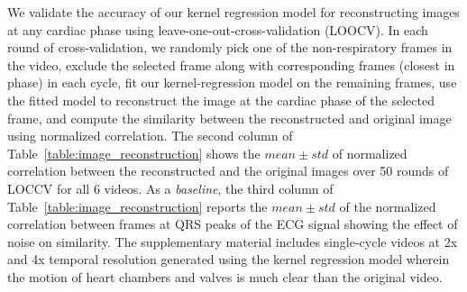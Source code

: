\documentclass[runningheads,a4paper]{llncs}
\begin{document}
	We validate the accuracy of our kernel regression model for reconstructing images at any cardiac phase using leave-one-out-cross-validation (LOOCV). In each round of cross-validation, we randomly pick one of the non-respiratory frames in the video, exclude the selected frame along with corresponding frames (closest in phase) in each cycle, fit our kernel-regression model on the remaining frames, use the fitted model to reconstruct the image at the cardiac phase of the selected frame, and compute the similarity between the reconstructed and original image using normalized correlation. The second column of Table~\ref{table:image_reconstruction} shows the $mean \pm std$ of normalized correlation between the reconstructed and the original images over 50 rounds of LOCCV for all 6 videos. As a \emph{baseline}, the third column of  Table~\ref{table:image_reconstruction} reports the $mean \pm std$ of the normalized correlation between frames at QRS peaks of the ECG signal showing the effect of noise on similarity. The supplementary material includes single-cycle videos at 2x and 4x temporal resolution generated using the kernel regression model wherein the motion of heart chambers and valves is much clear than the original video. 
%
%
\end{document}
